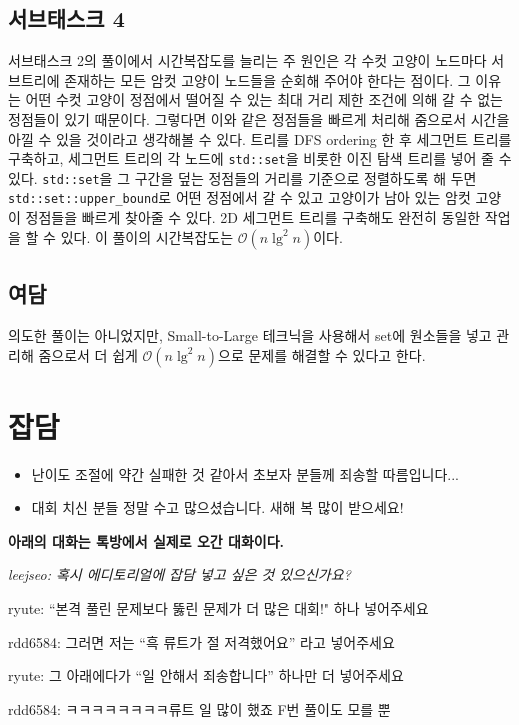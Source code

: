 \documentclass{article}
\begin{document}
	\subsection{서브태스크 4}
	서브태스크 2의 풀이에서 시간복잡도를 늘리는 주 원인은 각 수컷 고양이 노드마다 서브트리에 존재하는 모든 암컷 고양이 노드들을 순회해 주어야 한다는 점이다. 그 이유는 어떤 수컷 고양이 정점에서 떨어질 수 있는 최대 거리 제한 조건에 의해 갈 수 없는 정점들이 있기 때문이다. 그렇다면 이와 같은 정점들을 빠르게 처리해 줌으로서 시간을 아낄 수 있을 것이라고 생각해볼 수 있다. 트리를 DFS ordering 한 후 세그먼트 트리를 구축하고, 세그먼트 트리의 각 노드에 \texttt{std::set}을 비롯한 이진 탐색 트리를 넣어 줄 수 있다. \texttt{std::set}을 그 구간을 덮는 정점들의 거리를 기준으로 정렬하도록 해 두면 \texttt{std::set::upper\_bound}로 어떤 정점에서 갈 수 있고 고양이가 남아 있는 암컷 고양이 정점들을 빠르게 찾아줄 수 있다. 2D 세그먼트 트리를 구축해도 완전히 동일한 작업을 할 수 있다. 이 풀이의 시간복잡도는 $\mathcal{O}(n \lg^2 n)$이다.
	
	\subsection{여담}
	의도한 풀이는 아니었지만, Small-to-Large 테크닉을 사용해서 set에 원소들을 넣고 관리해 줌으로서 더 쉽게 $\mathcal{O}(n \lg^2 n)$으로 문제를 해결할 수 있다고 한다.
	\newpage
	
	\section{잡담}
	\begin{itemize}
		\item 난이도 조절에 약간 실패한 것 같아서 초보자 분들께 죄송할 따름입니다...
		\item 대회 치신 분들 정말 수고 많으셨습니다. 새해 복 많이 받으세요!
	\end{itemize}

	{\bf 아래의 대화는 톡방에서 실제로 오간 대화이다.}
	
	\it
	leejseo: 혹시 에디토리얼에 잡담 넣고 싶은 것 있으신가요? 
	
	ryute: ``본격 풀린 문제보다 뚫린 문제가 더 많은 대회!" 하나 넣어주세요
	
	rdd6584: 그러면 저는 ``흑 류트가 절 저격했어요'' 라고 넣어주세요
	
	ryute: 그 아래에다가 ``일 안해서 죄송합니다'' 하나만 더 넣어주세요
	
	rdd6584: ㅋㅋㅋㅋㅋㅋㅋㅋ류트 일 많이 했죠 F번 풀이도 모를 뿐
\end{document}
